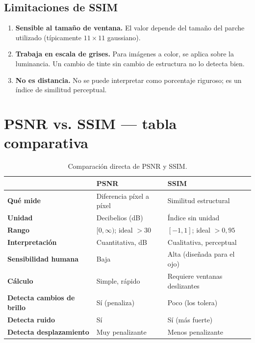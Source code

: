 \documentclass[11pt,a4paper]{article}
\begin{document}
\subsection{Limitaciones de SSIM}

\begin{enumerate}
    \item \textbf{Sensible al tamaño de ventana.} El valor depende del tamaño del
          parche utilizado (típicamente \(11\times 11\) gaussiano).
    \item \textbf{Trabaja en escala de grises.} Para imágenes a color, se aplica
          sobre la luminancia. Un cambio de tinte sin cambio de estructura no lo
          detecta bien.
    \item \textbf{No es distancia.} No se puede interpretar como porcentaje
          riguroso; es un índice de similitud perceptual.
\end{enumerate}

\section{PSNR vs. SSIM — tabla comparativa}

\begin{table}[H]
\centering
\caption{Comparación directa de PSNR y SSIM.}
\renewcommand{\arraystretch}{1.3}
\begin{tabular}{@{}p{} p{} p{}@{}}
\toprule
 & \textbf{PSNR} & \textbf{SSIM} \\
\midrule
\textbf{Qué mide} & Diferencia píxel a píxel & Similitud estructural \\
\textbf{Unidad} & Decibelios (dB) & Índice sin unidad \\
\textbf{Rango} & \([0, \infty)\); ideal \(> 30\) & \([-1, 1]\); ideal \(> 0{,}95\) \\
\textbf{Interpretación} & Cuantitativa, dB & Cualitativa, perceptual \\
\textbf{Sensibilidad humana} & Baja & Alta (diseñada para el ojo) \\
\textbf{Cálculo} & Simple, rápido & Requiere ventanas deslizantes \\
\textbf{Detecta cambios de brillo} & Sí (penaliza) & Poco (los tolera) \\
\textbf{Detecta ruido} & Sí & Sí (más fuerte) \\
\textbf{Detecta desplazamiento} & Muy penalizante & Menos penalizante \\
\bottomrule
\end{tabular}
\end{table}
\end{document}
